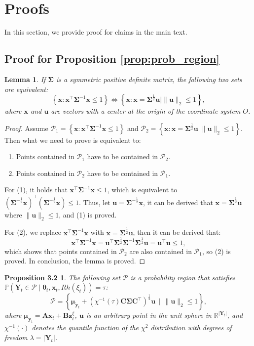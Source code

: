 \documentclass{article}
\theoremstyle{plain}
\newtheorem*{proposition32}{Proposition 3.2}
\newtheorem{lemma}[theorem]{Lemma}
\theoremstyle{definition}
\theoremstyle{remark}
\def \x {\mathbf{x}}
\def \sP {\mathcal{P}}
\def \Y {\mathbf{Y}}
\def \C {\mathbf{C}}
\def \y {\mathbf{y}}
\def \z {\mathbf{z}}
\def \u {\mathbf{u}}
\begin{document}
\section{Proofs}
\label{sec:proofs}
In this section, we provide proof for claims in the main text. 
\subsection{Proof for Proposition \ref{prop:prob_region}}
\begin{lemma}
  \label{lemma:two_ellipse_formula}
  If $\bm{\Sigma}$ is a symmetric positive definite matrix, the following two sets are equivalent:
  \[
    \left\{\x : \x^\top \bm{\Sigma}^{-1} \x \leq 1\right\} \Leftrightarrow \left\{\x : \x=\bm{\Sigma}^{\frac12}\u\mid \|\u\|_2\leq 1\right\},
  \]
  where $\x$ and $\u$ are vectors with a center at the origin of the coordinate system $O$.
\end{lemma}
\begin{proof}
  Assume $\sP_1 = \left\{\x : \x^\top \bm{\Sigma}^{-1} \x \leq 1\right\}$ and $\sP_2 = \left\{\x : \x=\bm{\Sigma}^{\frac12}\u\mid \|\u\|_2\leq 1\right\}$. Then what we need to prove is equivalent to:
  \begin{enumerate}
    \item[(1)] Points contained in $\sP_1$ have to be contained in $\sP_2$.
    \item[(2)] Points contained in $\sP_2$ have to be contained in $\sP_1$.
  \end{enumerate}

  For (1), it holds that $\x^\top \bm{\Sigma}^{-1} \x \leq 1$, which is equivalent to $(\bm{\Sigma}^{-\frac12}\x)^\top (\bm{\Sigma}^{-\frac12}\x)\leq 1$. 
  Thus, let $\u = \bm{\Sigma}^{-\frac12}\x$, it can be derived that $\x = \bm{\Sigma}^{\frac12}\u$ where $\|\u\|_2\leq 1$, and (1) is proved.

  For (2), we replace $\x^\top \bm{\Sigma}^{-1} \x$ with $\x=\bm{\Sigma}^{\frac12}\u$, then it can be derived that:
  \begin{equation*}
    \x^\top \bm{\Sigma}^{-1} \x = \u^\top\bm{\Sigma}^{\frac12}\bm{\Sigma}^{-1}\bm{\Sigma}^{\frac12}\u = \u^\top \u \leq 1,
  \end{equation*}
  which shows that points contained in $\sP_2$ are also contained in $\sP_1$, so (2) is proved. In conclusion, the lemma is proved.
\end{proof}

\begin{proposition32}
  The following set $\sP$ is a probability region that satisfies $\mathbb{P}(\Y_t \in \sP\mid \bm{\theta}_t, \x_t, Rh(\xi_t)) = \tau$: 
  \[
    \sP = \left\{\bm{\mu}_{\y_t} + \left(\chi^{-1}(\tau)\C\bm{\Sigma}\C^\top\right)^\frac{1}{2}\u\ \ \bigg|\ \ \|\u\|_2\leq 1\right\},
  \]
  where $\bm{\mu}_{\y_t} = \mathbf{A}\x_t+\mathbf{B}\z_t^{\xi}$, 
  $\u$ is an arbitrary point in the unit sphere in $\mathbb{R}^{|\Y_t|}$, 
  and $\chi^{-1}(\cdot)$ denotes the quantile function of the $\chi^2$ distribution with degrees of freedom $\lambda = \left|\Y_t\right|$.
\end{proposition32}
\end{document}
